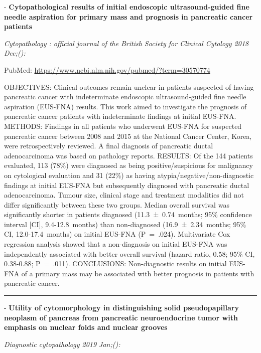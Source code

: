 \documentclass[]{article}
\begin{document}
 - \textbf{Cytopathological results of initial endoscopic
ultrasound-guided fine needle aspiration for primary mass and prognosis
in pancreatic cancer patients}

\emph{Cytopathology : official journal of the British Society for
Clinical Cytology 2018 Dec;():}

PubMed: \url{https://www.ncbi.nlm.nih.gov/pubmed/?term=30570774}

OBJECTIVES: Clinical outcomes remain unclear in patients suspected of
having pancreatic cancer with indeterminate endoscopic ultrasound-guided
fine needle aspiration (EUS-FNA) results. This work aimed to investigate
the prognosis of pancreatic cancer patients with indeterminate findings
at initial EUS-FNA. METHODS: Findings in all patients who underwent
EUS-FNA for suspected pancreatic cancer between 2008 and 2015 at the
National Cancer Center, Korea, were retrospectively reviewed. A final
diagnosis of pancreatic ductal adenocarcinoma was based on pathology
reports. RESULTS: Of the 144 patients evaluated, 113 (78\%) were
diagnosed as being positive/suspicious for malignancy on cytological
evaluation and 31 (22\%) as having atypia/negative/non-diagnostic
findings at initial EUS-FNA but subsequently diagnosed with pancreatic
ductal adenocarcinoma. Tumour size, clinical stage and treatment
modalities did not differ significantly between these two groups. Median
overall survival was significantly shorter in patients diagnosed
(11.3~±~0.74~months; 95\% confidence interval {[}CI{]}, 9.4-12.8~months)
than non-diagnosed (16.9~±~2.34~months; 95\% CI, 12.0-17.4~months) on
initial EUS-FNA (P~=~.024). Multivariate Cox regression analysis showed
that a non-diagnosis on initial EUS-FNA was independently associated
with better overall survival (hazard ratio, 0.58; 95\% CI, 0.38-0.88;
P~=~.011). CONCLUSIONS: Non-diagnostic results on initial EUS-FNA of a
primary mass may be associated with better prognosis in patients with
pancreatic cancer.

{}

{}

\begin{center}\rule{0.5\linewidth}{\linethickness}\end{center}

 - \textbf{Utility of cytomorphology in distinguishing solid
pseudopapillary neoplasm of pancreas from pancreatic neuroendocrine
tumor with emphasis on nuclear folds and nuclear grooves}

\emph{Diagnostic cytopathology 2019 Jan;():}
\end{document}
